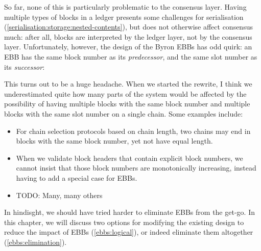 So far, none of this is particularly problematic to the consensus layer. Having
multiple types of blocks in a ledger presents some challenges for serialisation
(\cref{serialisation:storage:nested-contents}), but does not otherwise affect
consensus much: after all, blocks are interpreted by the ledger layer, not by
the consensus layer. Unfortunately, however, the design of the Byron EBBs has
odd quirk: an EBB has the same block number as its \emph{predecessor}, and the
same slot number as its \emph{successor}:
%
\begin{center}
\end{center}
%
This turns out to be a huge headache. When we started the rewrite, I think we
underestimated quite how many parts of the system would be affected by the
possibility of having multiple blocks with the same block number and
multiple blocks with the same slot number on a single chain. Some examples
include:

\begin{itemize}
\item \label{ebb-chain-selection}
For chain selection protocols based on chain length, two chains may end in
blocks with the same block number, yet not have equal length.

\item When we validate block headers that contain explicit block numbers, we
cannot insist that those block numbers are monotonically increasing, instead
having to add a special case for EBBs.

\item TODO: Many, many others
\end{itemize}

In hindisght, we should have tried harder to eliminate EBBs from the get-go. In
this chapter, we will discuss two options for modifying the existing design to
reduce the impact of EBBs (\cref{ebbs:logical}), or indeed eliminate them
altogether (\cref{ebbs:elimination}).

